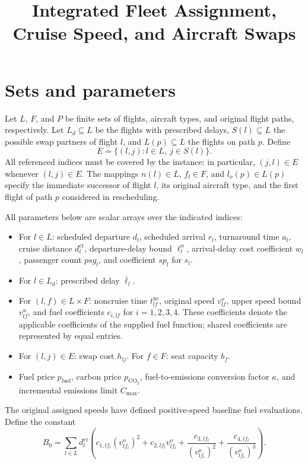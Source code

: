 \documentclass{article}
\title{Integrated Fleet Assignment, Cruise Speed, and Aircraft Swaps}
\date{}
\begin{document}
\maketitle

\section{Sets and parameters}
Let $L$, $F$, and $P$ be finite sets of flights, aircraft types, and original flight paths, respectively. Let $L_d\subseteq L$ be the flights with prescribed delays, $S(l)\subseteq L$ the possible swap partners of flight $l$, and $L(p)\subseteq L$ the flights on path $p$. Define
\[
 E=\{(l,j):l\in L,\ j\in S(l)\}.
\]
All referenced indices must be covered by the instance: in particular, $(j,l)\in E$ whenever $(l,j)\in E$. The mappings $n(l)\in L$, $f_l\in F$, and $l_o(p)\in L(p)$ specify the immediate successor of flight $l$, its original aircraft type, and the first flight of path $p$ considered in rescheduling.

All parameters below are scalar arrays over the indicated indices:
\begin{itemize}
\item For $l\in L$: scheduled departure $d_l$, scheduled arrival $r_l$, turnaround time $a_l$, cruise distance $d_l^{\mathrm{cr}}$, departure-delay bound $\ell_l^u$, arrival-delay cost coefficient $w_l$, passenger count $psg_l$, and coefficient $sp_l$ for $s_l$.
\item For $l\in L_d$: prescribed delay $\bar\ell_l$.
\item For $(l,f)\in L\times F$: noncruise time $t_{lf}^{\mathrm{nc}}$, original speed $v_{lf}^{o}$, upper speed bound $v_{lf}^{u}$, and fuel coefficients $c_{i,lf}$ for $i=1,2,3,4$. These coefficients denote the applicable coefficients of the supplied fuel function; shared coefficients are represented by equal entries.
\item For $(l,j)\in E$: swap cost $h_{lj}$. For $f\in F$: seat capacity $b_f$.
\item Fuel price $p_{\mathrm{fuel}}$, carbon price $p_{\mathrm{CO}_2}$, fuel-to-emissions conversion factor $\kappa$, and incremental emissions limit $C_{\max}$.
\end{itemize}
The original assigned speeds have defined positive-speed baseline fuel evaluations. Define the constant
\[
 B_0=\sum_{l\in L}d_l^{\mathrm{cr}}\left(
 c_{1,l f_l}(v_{l f_l}^{o})^2+c_{2,l f_l}v_{l f_l}^{o}
 +\frac{c_{3,l f_l}}{(v_{l f_l}^{o})^2}
 +\frac{c_{4,l f_l}}{(v_{l f_l}^{o})^3}\right).
\]
\end{document}
